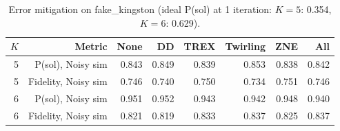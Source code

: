\begin{table}[t]
\centering
\small
\caption{Error mitigation on fake\_kingston (ideal P(sol) at 1 iteration: $K=5$: 0.354, $K=6$: 0.629).}
\label{tab:mitigation_fake_kingston}
\begin{tabular}{rrrrrrrr}
\toprule
$K$ & Metric & None & DD & TREX & Twirling & ZNE & All \\
\midrule
5 & P(sol), Noisy sim & 0.843 & 0.849 & 0.839 & 0.853 & 0.838 & 0.842 \\
5 & Fidelity, Noisy sim & 0.746 & 0.740 & 0.750 & 0.734 & 0.751 & 0.746 \\
6 & P(sol), Noisy sim & 0.951 & 0.952 & 0.943 & 0.942 & 0.948 & 0.940 \\
6 & Fidelity, Noisy sim & 0.821 & 0.819 & 0.833 & 0.837 & 0.825 & 0.837 \\
\bottomrule
\end{tabular}
\end{table}
